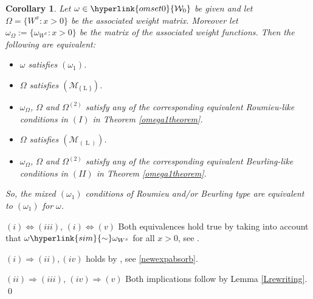 \documentclass[10pt]{amsart}%
\numberwithin{equation}{section}
\theoremstyle{plain}
\newtheorem{corollary}[proposition]{Corollary}
\let\on=\operatorname
\begin{document}
\begin{corollary}\label{Lrewritingcor}
Let $\omega\in\hyperlink{omset0}{\mathcal{W}_0}$ be given and let $\Omega=\{W^x: x>0\}$ be the associated weight matrix. Moreover let $\omega_{\Omega}:=\{\omega_{W^x}: x>0\}$ be the matrix of the associated weight functions. Then the following are equivalent:
\begin{itemize}
\item[$(i)$] $\omega$ satisfies \hyperlink{om1}{$(\omega_1)$}.

\item[$(ii)$] $\Omega$ satisfies \hyperlink{R-L}{$(\mathcal{M}_{\{\on{L}\}})$}.


\item[$(iii)$] $\omega_{\Omega}$, $\Omega$ and $\Omega^{(2)}$ satisfy any of the corresponding equivalent Roumieu-like conditions in $(I)$ in Theorem \ref{omega1theorem}.

\item[$(iv)$] $\Omega$ satisfies \hyperlink{B-L}{$(\mathcal{M}_{(\on{L})})$}.

\item[$(v)$] $\omega_{\Omega}$, $\Omega$ and $\Omega^{(2)}$ satisfy any of the corresponding equivalent Beurling-like conditions in $(II)$ in Theorem \ref{omega1theorem}.
\end{itemize}

So, the mixed \hyperlink{om1}{$(\omega_1)$} conditions of Roumieu and/or Beurling type are equivalent to \hyperlink{om1}{$(\omega_1)$} for $\omega$.
\end{corollary}

$(i)\Leftrightarrow(iii)$, $(i)\Leftrightarrow(v)$ Both equivalences hold true by taking into account that  $\omega\hyperlink{sim}{\sim}\omega_{W^x}$ for all $x>0$, see \cite[Lemma 5.7]{compositionpaper}.\vspace{6pt}

$(i)\Rightarrow(ii),(iv)$ holds by \cite[Lemma 5.9 $(5.10)$]{compositionpaper}, see \eqref{newexpabsorb}.\vspace{6pt}

$(ii)\Rightarrow(iii)$, $(iv)\Rightarrow(v)$ Both implications follow by Lemma \ref{Lrewriting}.
\qed\enddemo
\end{document}
